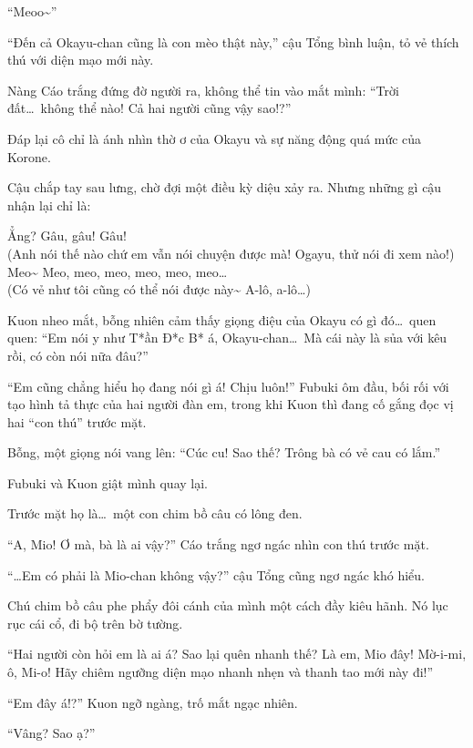 \documentclass[../main.tex]{subfiles}
\begin{document}
``Meoo\~{}''

``Đến cả Okayu-chan cũng là con mèo thật này,'' cậu Tổng bình luận, tỏ vẻ thích thú với diện mạo mới này.

Nàng Cáo trắng đứng đờ người ra, không thể tin vào mắt mình: ``Trời đất\dots\ không thể nào! Cả hai người cũng vậy sao!?''

Đáp lại cô chỉ là ánh nhìn thờ ơ của Okayu và sự năng động quá mức của Korone.

Cậu chắp tay sau lưng, chờ đợi một điều kỳ diệu xảy ra. Nhưng những gì cậu nhận lại chỉ là:

\begin{dialogue}
     Ẳng? Gâu, gâu! Gâu! \\ (Anh nói thế nào chứ em vẫn nói chuyện được mà! Ogayu, thử nói đi xem nào!)
     Meo\~{} Meo, meo, meo, meo, meo, meo\dots \\ (Có vẻ như tôi cũng có thể nói được này\~{} A-lô, a-lô\dots)
\end{dialogue}

Kuon nheo mắt, bỗng nhiên cảm thấy giọng điệu của Okayu có gì đó\dots\ quen quen: ``Em nói y như T*ần Đ*c B* á, Okayu-chan\dots\ Mà cái này là sủa với kêu rồi, có còn nói nữa đâu?''

``Em cũng chẳng hiểu họ đang nói gì á! Chịu luôn!'' Fubuki ôm đầu, bối rối với tạo hình tả thực của hai người đàn em, trong khi Kuon thì đang cố gắng đọc vị hai ``con thú'' trước mặt.

Bỗng, một giọng nói vang lên: ``Cúc cu! Sao thế? Trông bà có vẻ cau có lắm.''

Fubuki và Kuon giật mình quay lại.

Trước mặt họ là\dots\ một con chim bồ câu có lông đen.


``A, Mio! Ơ mà, bà là ai vậy?'' Cáo trắng ngơ ngác nhìn con thú trước mặt.

``\dots Em có phải là Mio-chan không vậy?'' cậu Tổng cũng ngơ ngác khó hiểu.

Chú chim bồ câu phe phẩy đôi cánh của mình một cách đầy kiêu hãnh. Nó lục rục cái cổ, đi bộ trên bờ tường.

``Hai người còn hỏi em là ai á? Sao lại quên nhanh thế? Là em, Mio đây! Mờ-i-mi, ô, Mi-o! Hãy chiêm ngưỡng diện mạo nhanh nhẹn và thanh tao mới này đi!''

``Em đây á!?'' Kuon ngỡ ngàng, trố mắt ngạc nhiên.

``Vâng? Sao ạ?''
\end{document}
